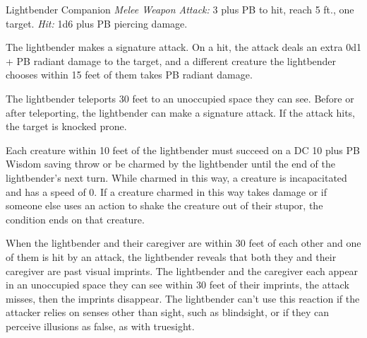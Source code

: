 \documentclass[10pt,a4paper,twoside,bg=print,twocolumn,openany,nodeprecatedcode]{dndbook}
\begin{document}
\begin{DndMonster}[float=t]{Lightbender Companion}
\DndMonsterBasics[
armor-class = {13 plus PB (natural armor)},
hit-points = {\DndDice{7 + seven times caregiver's level (number of d8 Hit Dice equal to their caregiver's level)}},
speed = {50 ft.}
]
\DndMonsterAbilityScores[
 str = 16,
 dex = 14,
 con = 14,
 int = 6,
 wis = 12,
 cha = 8
]
\DndMonsterDetails[
saving-throws = {Str +3 plus PB, Dex +2 plus PB},
skills = {Perception +1 plus PB, Stealth +2 plus PB},
senses = {darkvision 60 ft., passive perception 11 plus PB},
]
\textsl{Melee Weapon Attack:} 3 plus PB to hit, reach 5 ft., one target. \textsl{Hit:} 1d6 plus PB piercing damage.

The lightbender makes a signature attack. On a hit, the attack deals an extra 0d1 + PB radiant damage to the target, and a different creature the lightbender chooses within 15 feet of them takes PB radiant damage.

The lightbender teleports 30 feet to an unoccupied space they can see. Before or after teleporting, the lightbender can make a signature attack. If the attack hits, the target is knocked prone.

Each creature within 10 feet of the lightbender must succeed on a DC 10 plus PB Wisdom saving throw or be charmed by the lightbender until the end of the lightbender's next turn. While charmed in this way, a creature is incapacitated and has a speed of 0. If a creature charmed in this way takes damage or if someone else uses an action to shake the creature out of their stupor, the condition ends on that creature.

When the lightbender and their caregiver are within 30 feet of each other and one of them is hit by an attack, the lightbender reveals that both they and their caregiver are past visual imprints. The lightbender and the caregiver each appear in an unoccupied space they can see within 30 feet of their imprints, the attack misses, then the imprints disappear. The lightbender can't use this reaction if the attacker relies on senses other than sight, such as blindsight, or if they can perceive illusions as false, as with truesight.

\end{DndMonster}
\end{document}
